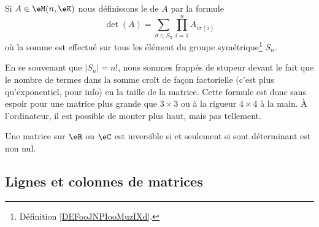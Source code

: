 \begin{definition}
    Si \( A\in\eM(n,\eK)\) nous définissons le  de \( A\) par la formule
    \begin{equation}
        \det(A)=\sum_{\sigma\in S_n}\prod_{i=1}^nA_{i\sigma(i)}
    \end{equation}
    où la somme est effectué sur tous les élément du groupe symétrique\footnote{Définition \ref{DEFooJNPIooMuzIXd}.} \( S_n\).
\end{definition}
En se souvenant que \( | S_n |=n!\), nous sommes frappés de stupeur devant le fait que le nombre de termes dans la somme croît de façon factorielle (c'est plus qu'exponentiel, pour info) en la taille de la matrice. Cette formule est donc sans espoir pour une matrice plus grande que \( 3\times 3\) ou à la rigueur \( 4\times 4\) à la main. À l'ordinateur, il est possible de monter plus haut, mais pas tellement.

\begin{theorem}     \label{THOooSNXWooSRjleb}
    Une matrice sur \( \eR\) ou \( \eC\) est inversible si et seulement si sont déterminant est non nul.
\end{theorem}

\subsection{Lignes et colonnes de matrices}

